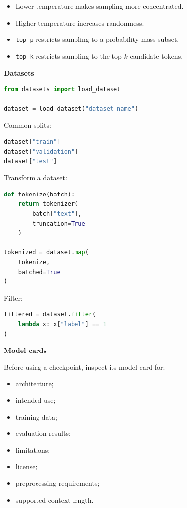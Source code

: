 \documentclass[11pt,letterpaper]{article}
\begin{document}
\begin{itemize}[leftmargin=*]
    \item Lower temperature makes sampling more concentrated.
    \item Higher temperature increases randomness.
    \item \texttt{top\_p} restricts sampling to a probability-mass subset.
    \item \texttt{top\_k} restricts sampling to the top $k$ candidate tokens.
\end{itemize}

\textbf{Datasets}

\begin{lstlisting}[language=Python]
from datasets import load_dataset

dataset = load_dataset("dataset-name")
\end{lstlisting}

Common splits:

\begin{lstlisting}[language=Python]
dataset["train"]
dataset["validation"]
dataset["test"]
\end{lstlisting}

Transform a dataset:

\begin{lstlisting}[language=Python]
def tokenize(batch):
    return tokenizer(
        batch["text"],
        truncation=True
    )

tokenized = dataset.map(
    tokenize,
    batched=True
)
\end{lstlisting}

Filter:

\begin{lstlisting}[language=Python]
filtered = dataset.filter(
    lambda x: x["label"] == 1
)
\end{lstlisting}

\textbf{Model cards}

Before using a checkpoint, inspect its model card for:

\begin{itemize}[leftmargin=*]
    \item architecture;
    \item intended use;
    \item training data;
    \item evaluation results;
    \item limitations;
    \item license;
    \item preprocessing requirements;
    \item supported context length.
\end{itemize}
\end{document}
